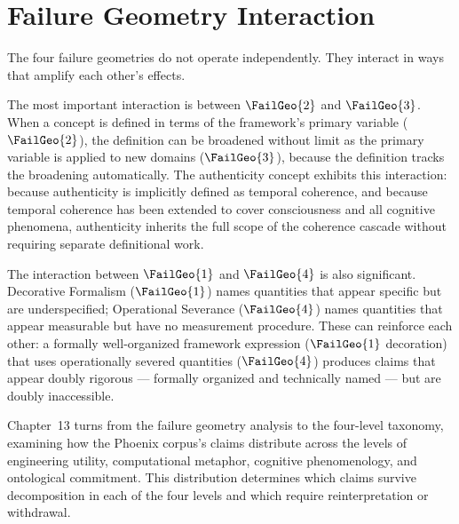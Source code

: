 \section{Failure Geometry Interaction}
\label{sec:fg-interaction}

The four failure geometries do not operate independently.
They interact in ways that amplify each other's effects.

The most important interaction is between $\FailGeo{2}$
and $\FailGeo{3}$. When a concept is defined in terms
of the framework's primary variable ($\FailGeo{2}$),
the definition can be broadened without limit as the
primary variable is applied to new domains ($\FailGeo{3}$),
because the definition tracks the broadening automatically.
The authenticity concept exhibits this interaction:
because authenticity is implicitly defined as temporal
coherence, and because temporal coherence has been
extended to cover consciousness and all cognitive
phenomena, authenticity inherits the full scope of the
coherence cascade without requiring separate definitional
work.

The interaction between $\FailGeo{1}$ and $\FailGeo{4}$
is also significant. Decorative Formalism ($\FailGeo{1}$)
names quantities that appear specific but are
underspecified; Operational Severance ($\FailGeo{4}$)
names quantities that appear measurable but have no
measurement procedure. These can reinforce each other:
a formally well-organized framework expression
($\FailGeo{1}$ decoration) that uses operationally
severed quantities ($\FailGeo{4}$) produces claims
that appear doubly rigorous --- formally organized
and technically named --- but are doubly inaccessible.

\medskip

Chapter~13 turns from the failure geometry analysis
to the four-level taxonomy, examining how the Phoenix
corpus's claims distribute across the levels of
engineering utility, computational metaphor, cognitive
phenomenology, and ontological commitment. This
distribution determines which claims survive
decomposition in each of the four levels and which
require reinterpretation or withdrawal.
